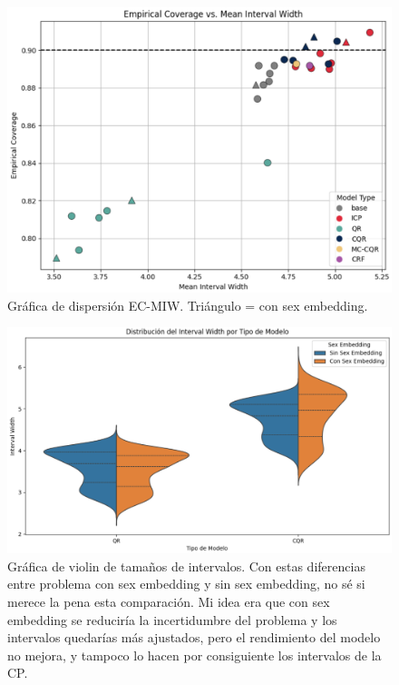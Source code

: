 \begin{figure}[h]
    \centering
    \includegraphics[width=\textwidth]{capitulos/cap_05/imagenes/EC-MIW.png}
    \caption[
        Gráfica de dispersión EC-MIW
    ]{
        Gráfica de dispersión EC-MIW. Triángulo = con sex embedding. 
    }
    \label{fig:ec-miw}
\end{figure}


\begin{figure}[h]
    \centering
    \includegraphics[width=\textwidth]{capitulos/cap_05/imagenes/violin_interval_width.png}
    \caption[
        Gráfica de violin de tamaños de intervalos
    ]{
        Gráfica de violin de tamaños de intervalos.
        Con estas diferencias entre problema con sex embedding y sin sex embedding, no sé si merece la pena
        esta comparación. Mi idea era que con sex embedding se reduciría la incertidumbre del problema y los 
        intervalos quedarías más ajustados, pero el rendimiento del modelo no mejora, y tampoco lo hacen por 
        consiguiente los intervalos de la CP. 
    }
    \label{fig:violin_interval_width}
\end{figure}


